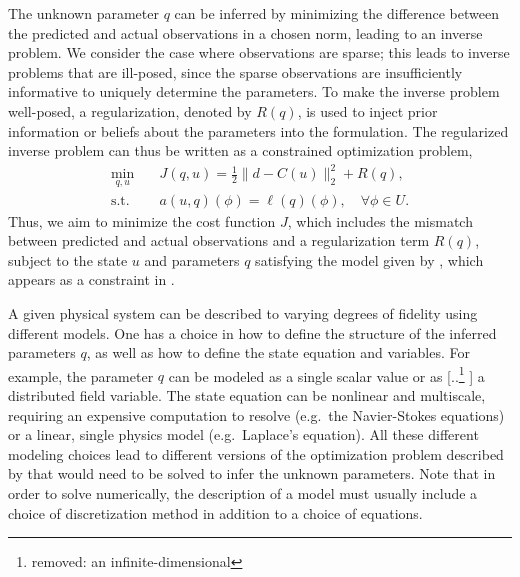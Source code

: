 \documentclass[review,sort&compress]{elsarticle}
\providecommand{\DIFaddtex}[1]{{\protect\color{blue} \sf #1}} %
\providecommand{\DIFdeltex}[1]{{\protect\color{red} [..\footnote{removed: #1} ]}} %
\providecommand{\DIFaddbegin}{} %
\providecommand{\DIFaddend}{} %
\providecommand{\DIFdelbegin}{} %
\providecommand{\DIFdelend}{} %
\providecommand{\DIFadd}[1]{\texorpdfstring{\DIFaddtex{#1}}{#1}} %
\providecommand{\DIFdel}[1]{\texorpdfstring{\DIFdeltex{#1}}{}} %
\newcommand{\DIFscaledelfig}{0.5}
\newlength{\DIFdelgraphicswidth} %
\newlength{\DIFdelgraphicsheight} %
\newcommand{\DIFaddincludegraphics}[2][]{{\color{blue}\fbox{\DIFOincludegraphics[#1]{#2}}}} %
\newcommand{\DIFdelincludegraphics}[2][]{%
\sbox{\DIFdelgraphicsbox}{\DIFOincludegraphics[#1]{#2}}%
\settoboxwidth{\DIFdelgraphicswidth}{\DIFdelgraphicsbox} %
\settoboxtotalheight{\DIFdelgraphicsheight}{\DIFdelgraphicsbox} %
\scalebox{\DIFscaledelfig}{%
\parbox[b]{\DIFdelgraphicswidth}{\usebox{\DIFdelgraphicsbox}\\[-\baselineskip] \rule{\DIFdelgraphicswidth}{0em}}\llap{\resizebox{\DIFdelgraphicswidth}{\DIFdelgraphicsheight}{%
\setlength{\unitlength}{\DIFdelgraphicswidth}%
\begin{picture}(1,1)%
\thicklines\linethickness{2pt} %
{\color[rgb]{1,0,0}\put(0,0){\framebox(1,1){}}}%
{\color[rgb]{1,0,0}\put(0,0){\line( 1,1){1}}}%
{\color[rgb]{1,0,0}\put(0,1){\line(1,-1){1}}}%
\end{picture}%
}\hspace*{3pt}}} %
} %
\DeclareRobustCommand{\DIFaddbegin}{\DIFOaddbegin \let\includegraphics\DIFaddincludegraphics} %
\DeclareRobustCommand{\DIFaddend}{\DIFOaddend \let\includegraphics\DIFOincludegraphics} %
\DeclareRobustCommand{\DIFdelbegin}{\DIFOdelbegin \let\includegraphics\DIFdelincludegraphics} %
\DeclareRobustCommand{\DIFdelend}{\DIFOaddend \let\includegraphics\DIFOincludegraphics} %
\begin{document}
The unknown parameter $q$ can be inferred by minimizing the difference between the predicted and actual observations in a chosen norm, leading to an inverse problem. We consider the case where observations are sparse; this leads to inverse problems that are ill-posed, since the sparse observations are insufficiently informative to uniquely determine the parameters. To make the inverse problem well-posed, a regularization, denoted by $R(q)$, is used to inject prior information or beliefs about the parameters into the formulation. The regularized inverse problem can thus be written as a constrained optimization problem,
%
\begin{subequations}
\label{eq:invOpt}
\begin{align}
\min\limits_{q,u} & \quad J(q,u)=\frac{1}{2}\|d-C(u)\|_2^2 + R(q), \label{eq:invOpt_obj} \\
\textrm{s.t. }& \quad a(u,q)(\phi)=\ell(q)(\phi),\quad\forall\phi\in U. \label{eq:invOpt_cons}
\end{align}
\end{subequations}
%
Thus, we aim to minimize the cost function $J$, which includes the mismatch between predicted and actual observations and a regularization term $R(q)$, subject to the state $u$ and parameters $q$ satisfying the model given by , which appears as a constraint in .

A given physical system can be described to varying degrees of fidelity using different models. One has a choice in how to define the structure of the inferred parameters $q$, as well as how to define the state equation and variables. For example, the parameter $q$ can be modeled as a single scalar value or as \DIFdelbegin \DIFdel{an infinite-dimensional }\DIFdelend \DIFaddbegin \DIFadd{a }\DIFaddend distributed field variable. The state equation can be nonlinear and multiscale, requiring an expensive computation to resolve (e.g.\ the Navier-Stokes equations) or a linear, single physics model (e.g.\ Laplace's equation). All these different modeling choices lead to different versions of the optimization problem described by  that would need to be solved to infer the unknown parameters. \DIFaddbegin \DIFadd{Note that in order to solve  numerically, the description of a model must usually include a choice of discretization method in addition to a choice of equations.
}\DIFaddend 
\end{document}
